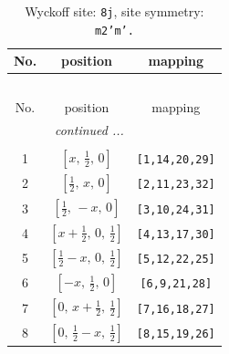 \documentclass[fleqn,8pt]{jsarticle}
\begin{document}
\begin{longtable}{ccc}
\caption{Wyckoff site: {\tt 8j}, site symmetry: {\tt m2'm'.}}
 \\
 \hline \hline
No. & position & mapping \\ \hline \endfirsthead

\multicolumn{2}{l}{\tablename\ \thetable{}} \\
 \hline \hline
No. & position & mapping \\ \hline \endhead

 \hline \hline
\multicolumn{2}{r}{\footnotesize\it continued ...} \\ \endfoot

 \hline \hline
\multicolumn{2}{r}{} \\ \endlastfoot

1 & $\left[ x,\, \frac{1}{2},\, 0 \right]$ & {\tt [1,14,20,29]} \\ \hline
2 & $\left[ \frac{1}{2},\, x,\, 0 \right]$ & {\tt [2,11,23,32]} \\ \hline
3 & $\left[ \frac{1}{2},\, - x,\, 0 \right]$ & {\tt [3,10,24,31]} \\ \hline
4 & $\left[ x + \frac{1}{2},\, 0,\, \frac{1}{2} \right]$ & {\tt [4,13,17,30]} \\ \hline
5 & $\left[ \frac{1}{2} - x,\, 0,\, \frac{1}{2} \right]$ & {\tt [5,12,22,25]} \\ \hline
6 & $\left[ - x,\, \frac{1}{2},\, 0 \right]$ & {\tt [6,9,21,28]} \\ \hline
7 & $\left[ 0,\, x + \frac{1}{2},\, \frac{1}{2} \right]$ & {\tt [7,16,18,27]} \\ \hline
8 & $\left[ 0,\, \frac{1}{2} - x,\, \frac{1}{2} \right]$ & {\tt [8,15,19,26]} \\
\end{longtable}
\renewcommand{\arraystretch}{1.2}
\end{document}
